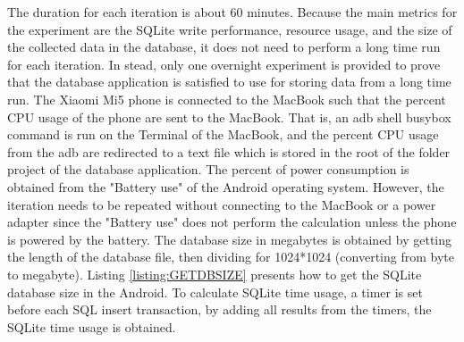The duration for each iteration is about 60 minutes. Because the main metrics for the experiment are the SQLite write performance, resource usage, and the size of the collected data in the database, it does not need to perform a long time run for each iteration. In stead, only one overnight experiment is provided to prove that the database application is satisfied to use for storing data from a long time run. The Xiaomi Mi5 phone is connected to the MacBook such that the percent CPU usage of the phone are sent to the MacBook. That is, an adb shell busybox command is run on the Terminal of the MacBook, and the percent CPU usage from the adb are redirected to a text file which is stored in the root of the folder project of the database application. The percent of power consumption is obtained from the "Battery use" of the Android operating system. However, the iteration needs to be repeated without connecting to the MacBook or a power adapter since the "Battery use" does not perform the calculation unless the phone is powered by the battery. The database size in megabytes is obtained by getting the length of the database file, then dividing for 1024*1024 (converting from byte to megabyte). Listing \ref{listing:GETDBSIZE} presents how to get the SQLite database size in the Android. To calculate SQLite time usage, a timer is set before each SQL insert transaction, by adding all results from the timers, the SQLite time usage is obtained.
